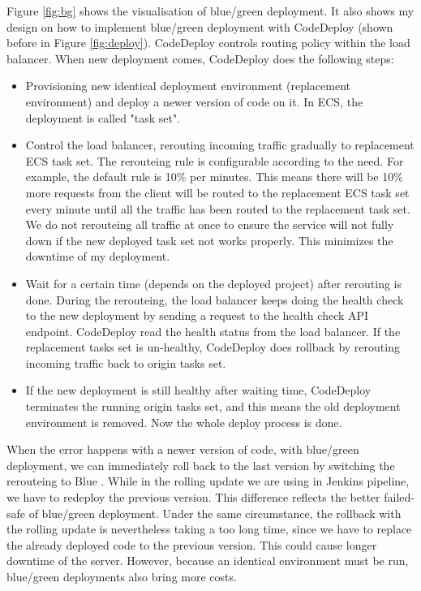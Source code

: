\par
Figure \ref{fig:bg} shows the visualisation of blue/green deployment. It also shows my design on how to implement blue/green deployment with CodeDeploy (shown before in Figure \ref{fig:deploy}). CodeDeploy controls routing policy within the load balancer. When new deployment comes, CodeDeploy does the following steps:
\begin{itemize}
 \item Provisioning new identical deployment environment (replacement environment) and deploy a newer version of code on it. In ECS, the deployment is called "task set".
 \item Control the load balancer, rerouting incoming traffic gradually to replacement ECS task set. The rerouteing rule is configurable according to the need. For example, the default rule is 10\% per minutes. This means there will be 10\% more requests from the client will be routed to the replacement ECS task set every minute until all the traffic has been routed to the replacement task set. We do not rerouteing all traffic at once to ensure the service will not fully down if the new deployed task set not works properly. This minimizes the downtime of my deployment.
 \item Wait for a certain time (depends on the deployed project) after rerouting is done. During the rerouteing, the load balancer keeps doing the health check to the new deployment by sending a request to the health check API endpoint. CodeDeploy read the health status from the load balancer. If the replacement tasks set is un-healthy, CodeDeploy does rollback by rerouting incoming traffic back to origin tasks set.
 \item If the new deployment is still healthy after waiting time, CodeDeploy terminates the running origin tasks set, and this means the old deployment environment is removed. Now the whole deploy process is done.
\end{itemize}
 When the error happens with a newer version of code, with blue/green deployment, we can immediately roll back to the last version by switching the rerouteing to Blue \cite{UsingBlu65:online}. While in the rolling update we are using in Jenkins pipeline, we have to redeploy the previous version. This difference reflects the better failed-safe of blue/green deployment. Under the same circumstance, the rollback with the rolling update is nevertheless taking a too long time, since we have to replace the already deployed code to the previous version. This could cause longer downtime of the server. However, because an identical environment must be run, blue/green deployments also bring more costs.
